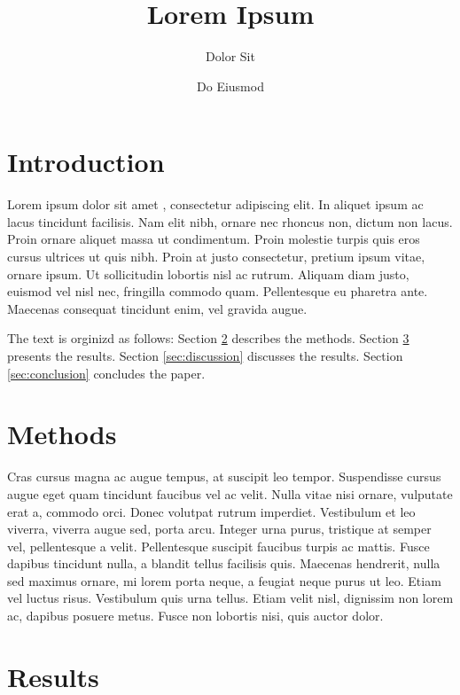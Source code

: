 \documentclass[12pt, aps, prb]{revtex4-2}
\begin{document}
\title{Lorem Ipsum}

\author{Dolor Sit}


\author{Do Eiusmod}

\maketitle

\section{Introduction}

Lorem ipsum dolor sit amet \cite{baroni2001}, consectetur adipiscing elit. In aliquet ipsum ac lacus tincidunt facilisis. Nam elit nibh, ornare nec rhoncus non, dictum non lacus. Proin ornare aliquet massa ut condimentum. Proin molestie turpis quis eros cursus ultrices ut quis nibh. Proin at justo consectetur, pretium ipsum vitae, ornare ipsum. Ut sollicitudin lobortis nisl ac rutrum. Aliquam diam justo, euismod vel nisl nec, fringilla commodo quam. Pellentesque eu pharetra ante. Maecenas consequat tincidunt enim, vel gravida augue.

The text is orginizd as follows: Section \ref{sec:methods} describes the methods. Section \ref{sec:results} presents the results. Section \ref{sec:discussion} discusses the results. Section \ref{sec:conclusion} concludes the paper.

\section{Methods}
\label{sec:methods}

Cras cursus magna ac augue tempus, at suscipit leo tempor. Suspendisse cursus augue eget quam tincidunt faucibus vel ac velit. Nulla vitae nisi ornare, vulputate erat a, commodo orci. Donec volutpat rutrum imperdiet. Vestibulum et leo viverra, viverra augue sed, porta arcu. Integer urna purus, tristique at semper vel, pellentesque a velit. Pellentesque suscipit faucibus turpis ac mattis. Fusce dapibus tincidunt nulla, a blandit tellus facilisis quis. Maecenas hendrerit, nulla sed maximus ornare, mi lorem porta neque, a feugiat neque purus ut leo. Etiam vel luctus risus. Vestibulum quis urna tellus. Etiam velit nisl, dignissim non lorem ac, dapibus posuere metus. Fusce non lobortis nisi, quis auctor dolor.

\section{Results}
\label{sec:results}
\end{document}
